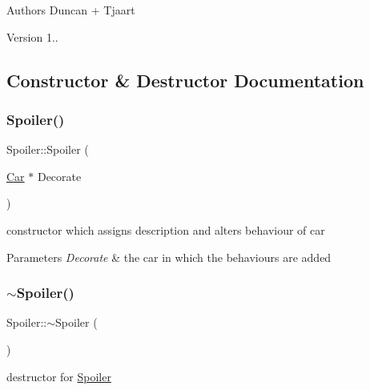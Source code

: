 \begin{DoxyAuthor}{Authors}
Duncan + Tjaart 
\end{DoxyAuthor}
\begin{DoxyVersion}{Version}
1.. 
\end{DoxyVersion}


\subsection{Constructor \& Destructor Documentation}
\mbox{\label{class_spoiler_a2cae3e69c5e246b4332c7718a7b381ba}} 
\subsubsection{\texorpdfstring{Spoiler()}{Spoiler()}\hspace{0.1cm}{\footnotesize\ttfamily [1/2]}}
{\footnotesize\ttfamily Spoiler\+::\+Spoiler (\begin{DoxyParamCaption}\item[{\mbox{\hyperlink{class_car}{Car}} $\ast$}]{Decorate }\end{DoxyParamCaption})\hspace{0.3cm}{\ttfamily [inline]}}

constructor which assigns description and alters behaviour of car 
\begin{DoxyParams}{Parameters}
{\em Decorate} & the car in which the behaviours are added \\
\hline
\end{DoxyParams}
\mbox{\label{class_spoiler_a0f1d8a66634330aef2a2e8d99360945e}} 
\subsubsection{\texorpdfstring{$\sim$\+Spoiler()}{~Spoiler()}}
{\footnotesize\ttfamily Spoiler\+::$\sim$\+Spoiler (\begin{DoxyParamCaption}{ }\end{DoxyParamCaption})\hspace{0.3cm}{\ttfamily [inline]}}

destructor for \mbox{\hyperlink{class_spoiler}{Spoiler}} \mbox{\label{class_spoiler_a6fbdbdf1a4ff3c894f74712bd0f118a8}} 
